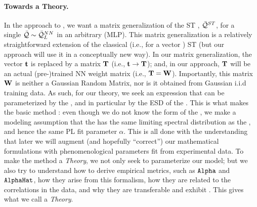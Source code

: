 \paragraph{Towards a \SemiEmpirical Theory.}
In the \SETOL approach to \STATMECH, we want a matrix generalization of the ST \ModelQuality, $\bar{\mathcal{Q}}^{ST}$, for a single \LayerQuality
$\bar{\mathcal{Q}}\sim\bar{\mathcal{Q}}^{NN}_{L}$ in an arbitrary \MultiLayerPerceptron (MLP).
This matrix generalization is a relatively straightforward extension of the classical (i.e., for a vector \Teacher) \SMOG ST \ModelQuality (but our \SETOL approach will use it in a conceptually new way).
%
In our matrix generalization, the \Teacher vector ${\mathbf{t}}$ is replaced by a \Teacher matrix ${\mathbf{T}}$ (i.e., ${\mathbf{t}}\rightarrow{\mathbf{T}}$); 
and, in our \SETOL approach, ${\mathbf{T}}$ will be an actual (pre-)trained NN weight matrix (i.e., ${\mathbf{T}}={\mathbf{W}}$). 
Importantly, this matrix ${\mathbf{W}}$ is neither a Gaussian Random Matrix, nor is it obtained from Gaussian i.i.d training data.
As such, for our \SETOL theory, we seek an expression that can be parameterized by the \Teacher, and in particular by the ESD of the \Teacher.
This is what makes the basic method \SemiEmpirical: even though we do not know the form of the \Teacher,
we make a modeling assumption that the  \Teacher has the same limiting spectral distribution as the \Student, 
and hence the same PL fit parameter $\alpha$. 
This is all done with the understanding that later we will augment
(and hopefully ``correct'') our mathematical formulations with 
phenomenological parameters fit from experimental data.
To make the \SemiEmpirical method a \SemiEmpirical \emph{Theory}, 
we not only seek to parameterize our model; but 
we also try to understand 
how to derive \HTSR empirical metrics, such as $\texttt{Alpha}$ and $\texttt{AlphaHat}$,
how they arise from this formalism, 
how they are related to the correlations in the data, and 
why they are transferable and exhibit \Universality.
This gives what we call a \SemiEmpirical \emph{Theory}.
